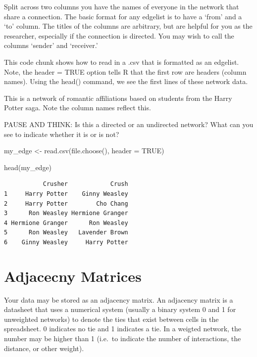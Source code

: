 \documentclass[
  letterpaper,
  DIV=11,
  numbers=noendperiod]{scrreprt}
\newenvironment{Shaded}{\begin{snugshade}}{\end{snugshade}}
\newcommand{\AttributeTok}[1]{\textcolor[rgb]{0.40,0.45,0.13}{#1}}
\newcommand{\ConstantTok}[1]{\textcolor[rgb]{0.56,0.35,0.01}{#1}}
\newcommand{\FunctionTok}[1]{\textcolor[rgb]{0.28,0.35,0.67}{#1}}
\newcommand{\NormalTok}[1]{\textcolor[rgb]{0.00,0.23,0.31}{#1}}
\newcommand{\OtherTok}[1]{\textcolor[rgb]{0.00,0.23,0.31}{#1}}
\begin{document}
Split across two columns you have the names of everyone in the network
that share a connection. The basic format for any edgelist is to have a
`from' and a `to' column. The titles of the columns are arbitrary, but
are helpful for you as the researcher, especially if the connection is
directed. You may wish to call the columns `sender' and `receiver.'

This code chunk shows how to read in a .csv that is formatted as an
edgelist. Note, the header = TRUE option tells R that the first row are
headers (column names). Using the head() command, we see the first lines
of these network data.

This is a network of romantic affiliations based on students from the
Harry Potter saga. Note the column names reflect this.

PAUSE AND THINK: Is this a directed or an undirected network? What can
you see to indicate whether it is or is not?

\begin{Shaded}
\begin{Highlighting}[]
\NormalTok{my\_edge }\OtherTok{\textless{}{-}} \FunctionTok{read.csv}\NormalTok{(}\FunctionTok{file.choose}\NormalTok{(), }\AttributeTok{header =} \ConstantTok{TRUE}\NormalTok{)}

\FunctionTok{head}\NormalTok{(my\_edge)}
\end{Highlighting}
\end{Shaded}

\begin{verbatim}
           Crusher            Crush
1     Harry Potter    Ginny Weasley
2     Harry Potter        Cho Chang
3      Ron Weasley Hermione Granger
4 Hermione Granger      Ron Weasley
5      Ron Weasley   Lavender Brown
6    Ginny Weasley     Harry Potter
\end{verbatim}

\section{Adjacecny Matrices}\label{adjacecny-matrices}

Your data may be stored as an adjacency matrix. An adjacency matrix is a
datasheet that uses a numerical system (usually a binary system 0 and 1
for unweighted networks) to denote the ties that exist between cells in
the spreadsheet. 0 indicates no tie and 1 indicates a tie. In a weigted
network, the number may be higher than 1 (i.e.~to indicate the number of
interactions, the distance, or other weight).
\end{document}
